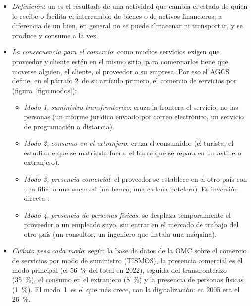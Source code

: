 \documentclass[11pt]{article}
\begin{document}
\begin{itemize}
\item \emph{Definición}: un  es el resultado de una actividad que cambia el estado de quien lo recibe o facilita el intercambio de bienes o de activos financieros; a diferencia de un bien, en general no se puede almacenar ni transportar, y se produce y consume a la vez\nocite{FMI2009MBP6}.
\item \emph{La consecuencia para el comercio}: como muchos servicios exigen que proveedor y cliente estén en el mismo sitio, para comerciarlos tiene que moverse alguien, el cliente, el proveedor o su empresa. Por eso el AGCS define, en el párrafo 2~de su artículo primero, el comercio de servicios por  (figura~\ref{figu:modos})\nocite{OMC1994AGCS}:
  \begin{itemize}
  \item \emph{Modo 1, suministro transfronterizo}: cruza la frontera el servicio, no las personas (un informe jurídico enviado por correo electrónico, un servicio de programación a distancia).
  \item \emph{Modo 2, consumo en el extranjero}: cruza el consumidor (el turista, el estudiante que se matricula fuera, el barco que se repara en un astillero extranjero).
  \item \emph{Modo 3, presencia comercial}: el proveedor se establece en el otro país con una filial o una sucursal (un banco, una cadena hotelera). Es inversión directa .
  \item \emph{Modo 4, presencia de personas físicas}: se desplaza temporalmente el proveedor o un empleado suyo, sin entrar en el mercado de trabajo del otro país (un consultor, un ingeniero que instala una máquina).
  \end{itemize}
\end{itemize}

\begin{infografia}[H]
\centering
\caption{Los 4~modos de suministro de servicios del AGCS: quién cruza la frontera}\label{figu:modos}
\end{infografia}

\begin{itemize}
\item \emph{Cuánto pesa cada modo}: según la base de datos de la OMC sobre el comercio de servicios por modo de suministro (TISMOS), la presencia comercial es el modo principal (el 56~\% del total en 2022), seguida del transfronterizo (35~\%), el consumo en el extranjero (8~\%) y la presencia de personas físicas (1~\%)\nocite{OMC2026TISMOS}. El modo~1~es el que más crece, con la digitalización: en 2005 era el 26~\%.
\end{itemize}
\end{document}
